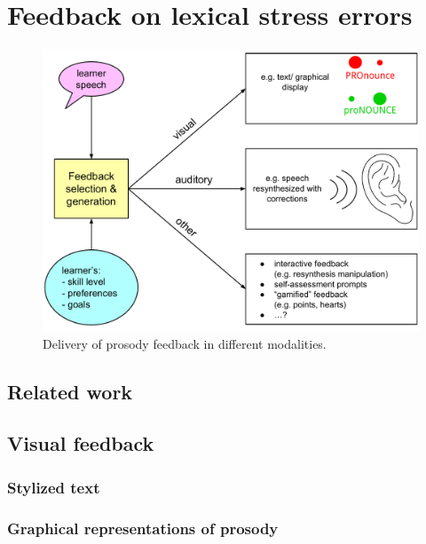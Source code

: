 %
%
\chapter{Feedback on lexical stress errors}
\label{chap:feedback}


\blindtext 

\begin{figure}[htb]
		\includegraphics[width=\textwidth]{../img/feedback}
		\caption{Delivery of prosody feedback in different modalities.}
		\label{fig:feedback}
	\end{figure}

\section{Related work}

\section{Visual feedback}
	\subsection{Stylized text}
	\subsection{Graphical representations of prosody}
